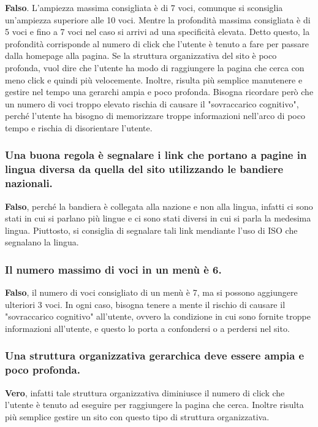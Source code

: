 \documentclass[12pt]{article}
\begin{document}
\textbf{Falso}. L'ampiezza massima consigliata è di 7 voci, comunque si
sconsiglia un'ampiezza superiore alle 10 voci. Mentre la profondità massima
consigliata è di 5 voci e fino a 7 voci nel caso si arrivi ad una specificità
elevata. Detto questo, la profondità corrisponde al numero di click che l'utente
è tenuto a fare per passare dalla homepage alla pagina. Se la struttura
organizzativa del sito è poco profonda, vuol dire che l'utente ha modo di
raggiungere la pagina che cerca con meno click e quindi più velocemente.
Inoltre, risulta più semplice manutenere e gestire nel tempo una gerarchi ampia
e poco profonda. Bisogna ricordare però che un numero di voci troppo elevato
rischia di causare il "sovraccarico cognitivo", perché l'utente ha bisogno di
memorizzare troppe informazioni nell'arco di poco tempo e rischia di
disorientare l'utente.

\subsubsection{Una buona regola è segnalare i link che portano a pagine in
	lingua diversa da quella del sito utilizzando le bandiere nazionali.}

\textbf{Falso}, perché la bandiera è collegata alla nazione e non alla lingua,
infatti ci sono stati in cui si parlano più lingue e ci sono stati diversi in
cui si parla la medesima lingua. Piuttosto, si consiglia di segnalare tali link
mendiante l'uso di ISO che segnalano la lingua.

\subsubsection{Il numero massimo di voci in un menù è 6.}
\textbf{Falso}, il numero di voci consigliato di un menù è 7, ma si
possono aggiungere ulteriori 3 voci. In ogni caso, bisogna tenere a mente il
rischio di causare il "sovraccarico cognitivo" all'utente, ovvero la condizione
in cui sono fornite troppe informazioni all'utente, e questo lo porta a
confondersi o a perdersi nel sito.

\subsubsection{Una struttura organizzativa gerarchica deve essere ampia e poco
	profonda.}

\textbf{Vero}, infatti tale struttura organizzativa diminiusce il numero di
click che l'utente è tenuto ad eseguire per raggiungere la pagina che cerca.
Inoltre risulta più semplice gestire un sito con questo tipo di struttura
organizzativa.
\end{document}
